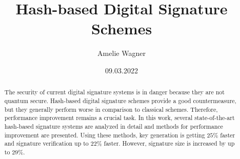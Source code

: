 \documentclass[ngerman,BCOR=4mm, english]{tudscrreprt}
\newcommand{\?}{\stackrel{?}{=}} %
\begin{document}
\date{09.03.2022}
\title{%
  Hash-based Digital Signature Schemes
}
\subject{master}
\author{%
  Amelie Wagner%
}
\maketitle %



\begin{otherlanguage}{ngerman} %
\confirmation
\end{otherlanguage}

\begin{abstract}
The security of current digital signature systems is in danger because they are not quantum secure. Hash-based digital signature schemes provide a good  countermeasure, but they generally perform worse in comparison to classical schemes. Therefore, performance improvement remains a crucial task.  
In this work, several state-of-the-art hash-based signature systems are analyzed in detail and methods for performance improvement are presented.
Using these methods, key generation is getting $25\%$ faster and signature verification up to $22\%$ faster. However, signature size is increased by up to $29\%$.
\end{abstract}

\tableofcontents







\appendix 





\end{document}
